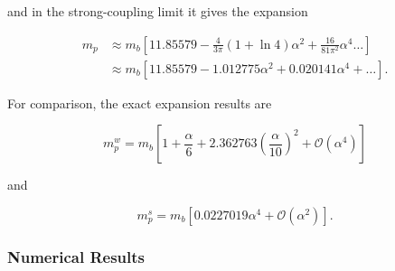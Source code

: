 and in the strong-coupling limit it gives the expansion

\begin{equation}
    \label{eqn:strong_mass_feynman}
    \begin{aligned}
    m_p &\approx m_b \left[ 11.85579 - \frac{4}{3\pi} (1 + \ln 4) \alpha^2 + \frac{16}{81\pi^2} \alpha^4 \dots \right] \\
    &\approx m_b \left[11.85579 - 1.012775 \alpha^2 + 0.020141 \alpha^4 + \dots\right].
    \end{aligned}
\end{equation}

For comparison, the exact expansion results are

\begin{equation}
    m^w_p = m_b \left[ 1 + \frac{\alpha}{6} + 2.362763 \left(\frac{\alpha}{10}\right)^2 + \mathcal{O}\left(\alpha^4\right) \right]
\end{equation}

and

\begin{equation}
    m^s_p = m_b \left[ 0.0227019 \alpha^4 + \mathcal{O}\left(\alpha^2\right) \right].
\end{equation}

\subsubsection{Numerical Results}

